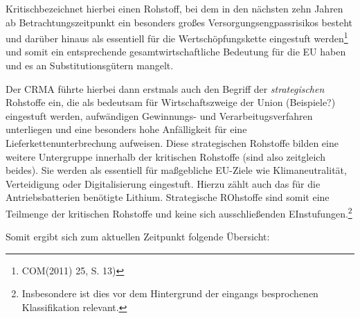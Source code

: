 \documentclass[12pt,a4paper,oneside]{book} %
\begin{document}
\glqq Kritisch\grqq bezeichnet hierbei einen Rohstoff, bei dem in den nächsten zehn Jahren ab Betrachtungszeitpunkt ein besonders großes Versorgungsengpassrisikos besteht und darüber hinaus als essentiell für die Wertschöpfungskette eingestuft werden\footnote{COM(2011) 25, S. 13)} und somit ein entsprechende gesamtwirtschaftliche Bedeutung für die EU haben und es an Substitutionsgütern mangelt.

Der CRMA führte hierbei dann erstmals auch den Begriff der \textit{strategischen} Rohstoffe ein, die als bedeutsam für Wirtschaftszweige der Union (Beispiele?) eingestuft werden, aufwändigen Gewinnungs- und Verarbeitugsverfahren unterliegen und eine besonders hohe Anfälligkeit für eine Lieferkettenunterbrechung aufweisen. Diese strategischen Rohstoffe bilden eine weitere Untergruppe innerhalb der kritischen Rohstoffe (sind also zeitgleich beides). Sie werden als essentiell für maßgebliche EU-Ziele wie Klimaneutralität, Verteidigung oder Digitalisierung eingestuft. Hierzu zählt auch das für die Antriebsbatterien benötigte Lithium. Strategische ROhstoffe sind somit eine Teilmenge der kritischen Rohstoffe und keine sich ausschließenden EInstufungen.\footnote{Insbesondere ist dies vor dem Hintergrund der eingangs besprochenen Klassifikation relevant.}

Somit ergibt sich zum aktuellen Zeitpunkt folgende Übersicht:
\end{document}
